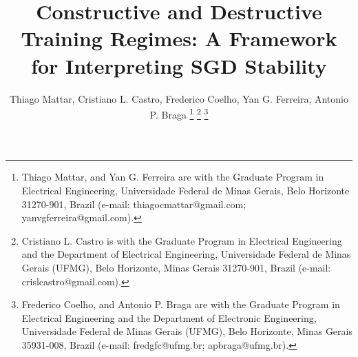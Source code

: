 \documentclass[journal]{IEEEtran}
\begin{document}
%
\title{Constructive and Destructive Training Regimes: A Framework for Interpreting SGD Stability}
%
%
%



\author{Thiago Mattar, %
        Cristiano L. Castro,
        Frederico Coelho, %
        Yan G. Ferreira,
        Antonio P. Braga  %
\thanks{Thiago Mattar, and Yan G. Ferreira are with the Graduate Program in Electrical Engineering, Universidade Federal de Minas Gerais, Belo Horizonte 31270-901, Brazil (e-mail: thiagocmattar@gmail.com; yanvgferreira@gmail.com).}
\thanks{Cristiano L. Castro is with the Graduate Program in Electrical Engineering and the Department of Electrical Engineering, Universidade Federal de Minas Gerais (UFMG), Belo Horizonte, Minas Gerais 31270-901, Brazil (e-mail: crislcastro@gmail.com).}
\thanks{Frederico Coelho, and Antonio P. Braga are with the Graduate Program in Electrical Engineering and the Department of Electronic Engineering, Universidade Federal de Minas Gerais (UFMG), Belo Horizonte,
Minas Gerais 35931-008, Brazil (e-mail: fredgfc@ufmg.br; apbraga@ufmg.br).}
}




\maketitle

\end{document}
